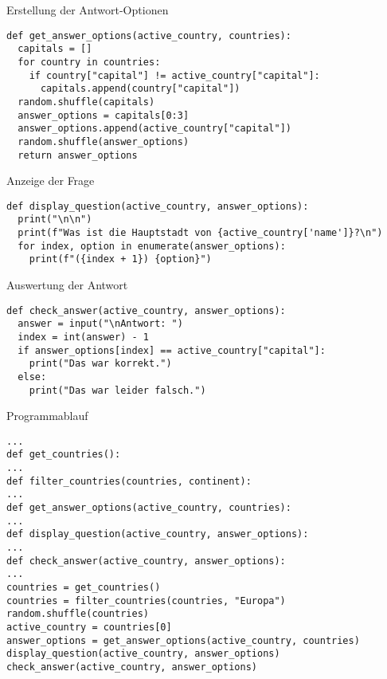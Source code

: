 \begin{fragile}
	
\begin{block}{Erstellung der Antwort-Optionen}
\vspace{2pt}
\begin{verbatim}
def get_answer_options(active_country, countries):
  capitals = []
  for country in countries:
    if country["capital"] != active_country["capital"]:
      capitals.append(country["capital"])
  random.shuffle(capitals)
  answer_options = capitals[0:3]
  answer_options.append(active_country["capital"])
  random.shuffle(answer_options)
  return answer_options
\end{verbatim}
\end{block}

\end{fragile}

\begin{fragile}
\begin{block}{Anzeige der Frage}
\vspace{2pt}
\begin{verbatim}
def display_question(active_country, answer_options):
  print("\n\n")
  print(f"Was ist die Hauptstadt von {active_country['name']}?\n")
  for index, option in enumerate(answer_options):
    print(f"({index + 1}) {option}")
\end{verbatim}
\end{block}

\vspace{12pt}
\pause 

\begin{block}{Auswertung der Antwort}
	\vspace{2pt}
	\begin{verbatim}
def check_answer(active_country, answer_options):
  answer = input("\nAntwort: ")
  index = int(answer) - 1
  if answer_options[index] == active_country["capital"]:
    print("Das war korrekt.")
  else:
    print("Das war leider falsch.")
\end{verbatim}
\end{block}

\end{fragile}


\begin{fragile}
\begin{block}{Programmablauf}
\vspace{2pt}
\begin{verbatim}
...	
def get_countries():
...
def filter_countries(countries, continent):
...
def get_answer_options(active_country, countries):
...
def display_question(active_country, answer_options):
...
def check_answer(active_country, answer_options):
...
countries = get_countries()
countries = filter_countries(countries, "Europa")
random.shuffle(countries)
active_country = countries[0]
answer_options = get_answer_options(active_country, countries)
display_question(active_country, answer_options)
check_answer(active_country, answer_options)	
\end{verbatim}
\end{block}
\end{fragile}


